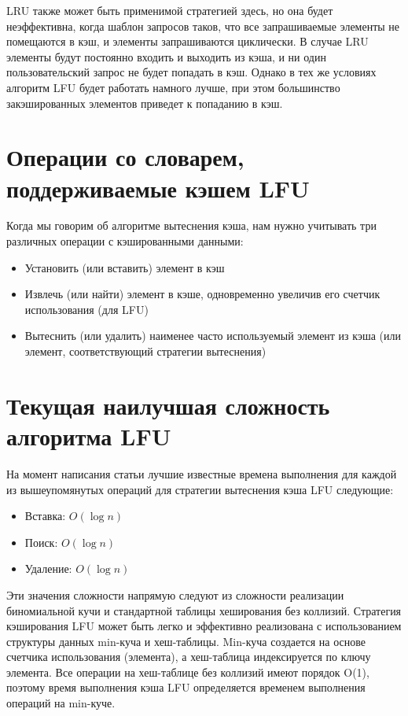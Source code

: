 \documentclass[a4paper, 12pt]{article}
\begin{document}
LRU также может быть применимой стратегией здесь, но она будет неэффективна, когда шаблон запросов таков, что все запрашиваемые элементы не помещаются в кэш, и элементы запрашиваются циклически. В случае LRU элементы будут постоянно входить и выходить из кэша, и ни один пользовательский запрос не будет попадать в кэш. Однако в тех же условиях алгоритм LFU будет работать намного лучше, при этом большинство закэшированных элементов приведет к попаданию в кэш.

\section{Операции со словарем, поддерживаемые кэшем LFU}

Когда мы говорим об алгоритме вытеснения кэша, нам нужно учитывать три различных операции с кэшированными данными:

\begin{itemize}
    \item Установить (или вставить) элемент в кэш
    \item Извлечь (или найти) элемент в кэше, одновременно увеличив его счетчик использования (для LFU)
    \item Вытеснить (или удалить) наименее часто используемый элемент из кэша (или элемент, соответствующий стратегии вытеснения)
\end{itemize}

\section{Текущая наилучшая сложность алгоритма LFU}

На момент написания статьи лучшие известные времена выполнения для каждой из вышеупомянутых операций для стратегии вытеснения кэша LFU следующие:


\begin{itemize}
    \item Вставка: $O(\log{n})$
    \item Поиск: $O(\log{n})$
    \item Удаление: $O(\log{n})$
\end{itemize}

Эти значения сложности напрямую следуют из сложности реализации биномиальной кучи и стандартной таблицы хеширования без коллизий. Стратегия кэширования LFU может быть легко и эффективно реализована с использованием структуры данных min-куча и хеш-таблицы. Min-куча создается на основе счетчика использования (элемента), а хеш-таблица индексируется по ключу элемента. Все операции на хеш-таблице без коллизий имеют порядок O(1), поэтому время выполнения кэша LFU определяется временем выполнения операций на min-куче.
\end{document}
